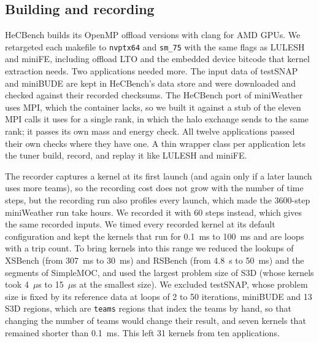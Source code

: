 \documentclass[10pt]{article}
\newcommand{\code}[1]{\texttt{#1}}
\begin{document}
\subsection{Building and recording}
HeCBench builds its OpenMP offload versions with clang for AMD GPUs. We
retargeted each makefile to \code{nvptx64} and \code{sm\_75} with the same
flags as LULESH and miniFE, including offload LTO and the embedded device
bitcode that kernel extraction needs. Two applications needed more. The
input data of testSNAP and miniBUDE are kept in HeCBench's data store and
were downloaded and checked against their recorded checksums. The HeCBench
port of miniWeather uses MPI, which the container lacks, so we built it
against a stub of the eleven MPI calls it uses for a single rank, in which
the halo exchange sends to the same rank; it passes its own mass and energy
check. All twelve applications passed their own checks where they have one.
A thin wrapper class per application lets the tuner build, record, and
replay it like LULESH and miniFE.

The recorder captures a kernel at its first launch (and again only if a later
launch uses more teams), so the recording cost does not grow with the number
of time steps, but the recording run also profiles every launch, which made
the 3600-step miniWeather run take hours. We recorded it with 60 steps
instead, which gives the same recorded inputs. We timed every recorded
kernel at its default configuration and kept the kernels that run for
0.1~ms to 100~ms and are loops with a trip count. To bring kernels into this
range we reduced the lookups of XSBench (from 307~ms to 30~ms) and RSBench
(from 4.8~s to 50~ms) and the segments of SimpleMOC, and used the largest
problem size of S3D (whose kernels took 4~$\mu$s to 15~$\mu$s at the
smallest size). We excluded testSNAP, whose problem size is fixed by its
reference data at loops of 2 to 50 iterations, miniBUDE and 13 S3D regions,
which are \code{teams} regions that index the teams by hand, so that changing
the number of teams would change their result, and seven kernels that remained
shorter than 0.1~ms. This left 31 kernels from ten applications.
\end{document}
